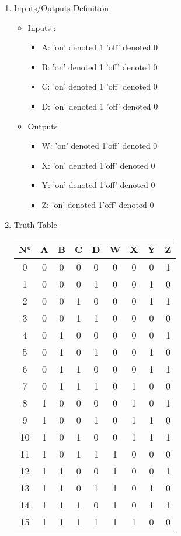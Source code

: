 \begin{enumerate}
\item Inputs/Outputs  Definition
\begin{itemize}
\item Inputs :
\begin{itemize}
\item A: \qquad 'on' denoted 1 \qquad 'off' denoted 0 
\item B: \qquad 'on' denoted 1 \qquad 'off' denoted 0 
\item C: \qquad 'on' denoted 1 \qquad 'off' denoted 0 
\item D: \qquad 'on' denoted 1 \qquad 'off' denoted 0 
\end{itemize}
\item Outputs 
\begin{itemize}
\item W: \qquad 'on' denoted 1\qquad 'off' denoted  0
\item X: \qquad 'on' denoted 1\qquad 'off' denoted  0
\item Y: \qquad 'on' denoted 1\qquad 'off' denoted  0
\item Z: \qquad 'on' denoted 1\qquad 'off' denoted  0
\end{itemize}
\end{itemize}
\item Truth Table 

        \begin{tabular}{|c|c|c|c|c||c|c|c|c|}

    \toprule

        N° &A & B & C & D & W & X & Y & Z\\ \midrule
0 & 0 & 0 & 0 & 0 & 0 & 0 & 0 & 1\\
1 & 0 & 0 & 0 & 1 & 0 & 0 & 1 & 0\\
2 & 0 & 0 & 1 & 0 & 0 & 0 & 1 & 1\\
3 & 0 & 0 & 1 & 1 & 0 & 0 & 0 & 0\\
\midrule
4 & 0 & 1 & 0 & 0 & 0 & 0 & 0 & 1\\
5 & 0 & 1 & 0 & 1 & 0 & 0 & 1 & 0\\
6 & 0 & 1 & 1 & 0 & 0 & 0 & 1 & 1\\
7 & 0 & 1 & 1 & 1 & 0 & 1 & 0 & 0\\
\midrule
8 & 1 & 0 & 0 & 0 & 0 & 1 & 0 & 1\\
9 & 1 & 0 & 0 & 1 & 0 & 1 & 1 & 0\\
10 & 1 & 0 & 1 & 0 & 0 & 1 & 1 & 1\\
11 & 1 & 0 & 1 & 1 & 1 & 0 & 0 & 0\\
\midrule
12 & 1 & 1 & 0 & 0 & 1 & 0 & 0 & 1\\
13 & 1 & 1 & 0 & 1 & 1 & 0 & 1 & 0\\
14 & 1 & 1 & 1 & 0 & 1 & 0 & 1 & 1\\
15 & 1 & 1 & 1 & 1 & 1 & 1 & 0 & 0\\
\bottomrule


\end{tabular}
\end{enumerate}
